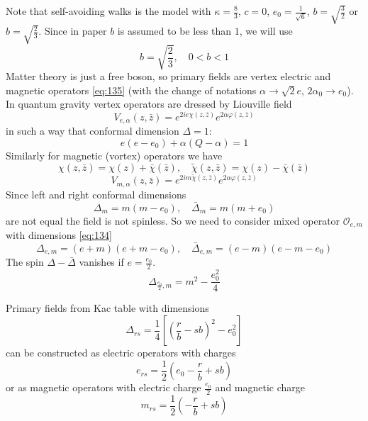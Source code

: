 \documentclass[12pt]{article}
\begin{document}
Note that self-avoiding walks is the model with $\kappa=\frac{8}{3}$, $c=0$,
$e_{0}=\frac{1}{\sqrt{6}}$, $b=\sqrt{\frac{3}{2}}$ or $b=\sqrt{\frac{2}{3}}$. Since in paper
\cite{kostov2004boundary} $b$ is assumed to be less than $1$, we will use
\begin{equation}
  \label{eq:166}
  b=\sqrt{\frac{2}{3}}, \quad 0<b<1
\end{equation}
Matter theory is just a free boson, so primary fields are vertex electric and magnetic operators
\eqref{eq:135} (with the change of notations $\alpha\to \sqrt{2} e$, $2\alpha_{0}\to  e_{0}$). In
quantum gravity vertex operators are dressed by Liouville field
\begin{equation}
  \label{eq:167}
  V_{e,\alpha}(z,\bar z)=e^{2ie\chi(z,\bar z)} e^{2\alpha\varphi(z,\bar z)}
\end{equation}
in such a way that conformal dimension $\Delta=1$:
\begin{equation}
  \label{eq:168}
  e(e-e_{0})+\alpha(Q-\alpha)=1
\end{equation}
Similarly for magnetic (vortex) operators we have
\begin{equation}
  \label{eq:169}
  \chi(z,\bar z)=\chi(z)+\bar\chi(\bar z),\quad \tilde\chi(z,\bar z)=\chi(z)-\bar\chi(\bar z)
\end{equation}
\begin{equation}
  \label{eq:170}
  V_{m,\alpha}(z,\bar z)=e^{2im\tilde\chi(z,\bar z)} e^{2\alpha\varphi(z,\bar z)}
\end{equation}
Since left and right conformal dimensions
\begin{equation}
  \label{eq:171}
  \Delta_{m}=m(m-e_{0}), \quad \bar\Delta_{m}=m(m+e_{0})
\end{equation}
are not equal the field is not spinless. So we need to consider mixed operator $\mathcal{O}_{e,m}$
with dimensions \eqref{eq:134}
\begin{equation}
  \label{eq:172}
  \Delta_{e,m}=(e+m)(e+m-e_{0}), \quad \bar \Delta_{e,m}=(e-m)(e-m-e_{0})
\end{equation}
The spin $\Delta-\bar\Delta$ vanishes if $e=\frac{e_{0}}{2}$.
\begin{equation}
  \label{eq:173}
  \Delta_{\frac{e_{0}}{2},m}=m^{2}-\frac{e_{0}^{2}}{4}
\end{equation}

Primary fields from Kac table with dimensions
\begin{equation}
  \label{eq:174}
  \Delta_{rs}=\frac{1}{4}\left[\left(\frac{r}{b}-sb\right)^{2}-e_{0}^{2}\right]
\end{equation}
can be constructed as electric operators with charges
\begin{equation}
  \label{eq:175}
  e_{rs}=\frac{1}{2}\left(e_{0}-\frac{r}{b}+sb\right)
\end{equation}
or as magnetic operators with electric charge $\frac{e_{0}}{2}$ and magnetic charge
\begin{equation}
  \label{eq:176}
  m_{rs}=\frac{1}{2}\left(-\frac{r}{b}+sb\right)
\end{equation}
\end{document}
